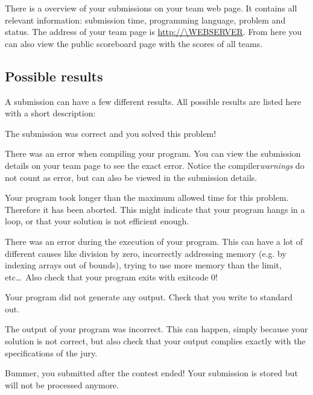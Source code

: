 There is a overview of your submissions on your team web page.
It contains all relevant information: submission time, programming
language, problem and status. The address of your team page is
\url{http://\WEBSERVER}. From here you can also view the public
scoreboard page with the scores of all teams.

\subsection{Possible results}

A submission can have a few different results. All possible results
are listed here with a short description:

\begin{description}[\setleftmargin{4.5cm}]
\item[CORRECT]
The submission was correct and you solved this problem!

\item[COMPILER-ERROR]
There was an error when compiling your program. You can view the
submission details on your team page to see the exact error.
Notice the compiler\emph{warnings} do not count as error, but can also
be viewed in the submission details.

\item[TIMELIMIT]
Your program took longer than the maximum allowed time for this
problem. Therefore it has been aborted. This might indicate that your
program hangs in a loop, or that your solution is not efficient
enough.

\item[RUN-ERROR]
There was an error during the execution of your program. This can have
a lot of different causes like division by zero, incorrectly
addressing memory (e.g. by indexing arrays out of bounds), trying to
use more memory than the limit, etc\dots\ 
Also check that your program exits with exitcode 0!

\item[NO-OUTPUT]
Your program did not generate any output. Check that you write to
standard out.

\item[WRONG-ANSWER]
The output of your program was incorrect. This can happen, simply
because your solution is not correct, but also check that your output
complies exactly with the specifications of the jury.

\item[TOO-LATE]
Bummer, you submitted after the contest ended! Your submission is stored but
will not be processed anymore.
\end{description}

